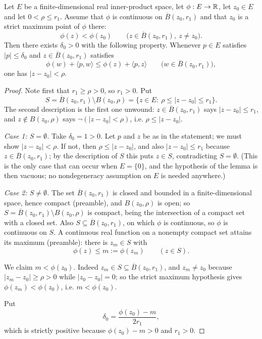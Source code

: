 \begin{lemma}
Let $E$ be a finite-dimensional real inner-product space, let $\phi:E\to\mathbb{R}$, let
$z_0\in E$ and let $0<\rho\le r_1$. Assume that $\phi$ is continuous on
$\overline B(z_0,r_1)$ and that $z_0$ is a strict maximum point of $\phi$ there:
\[
  \phi(z)<\phi(z_0)\qquad\bigl(z\in\overline B(z_0,r_1),\ z\ne z_0\bigr).
\]
Then there exists $\delta_0>0$ with the following property. Whenever $p\in E$
satisfies $|p|\le\delta_0$ and $z\in\overline B(z_0,r_1)$ satisfies
\[
  \phi(w)+\langle p,w\rangle\le\phi(z)+\langle p,z\rangle
  \qquad\bigl(w\in\overline B(z_0,r_1)\bigr),
\]
one has $|z-z_0|<\rho$.
\end{lemma}
\begin{proof}
Note first that $r_1\ge\rho>0$, so $r_1>0$. Put
\[
  S=\overline B(z_0,r_1)\setminus B(z_0,\rho)
   =\bigl\{z\in E:\ \rho\le|z-z_0|\le r_1\bigr\}.
\]
The second description is the first one unwound: $z\in\overline B(z_0,r_1)$ says
$|z-z_0|\le r_1$, and $z\notin B(z_0,\rho)$ says $\neg(|z-z_0|<\rho)$, i.e.
$\rho\le|z-z_0|$.

\emph{Case 1: $S=\emptyset$.}
Take $\delta_0=1>0$. Let $p$ and $z$ be as in the statement; we must show
$|z-z_0|<\rho$. If not, then $\rho\le|z-z_0|$, and also $|z-z_0|\le r_1$
because $z\in\overline B(z_0,r_1)$; by the description of $S$ this puts $z\in
S$, contradicting $S=\emptyset$. (This is the only case that can occur when
$E=\{0\}$, and the hypothesis of the lemma is then vacuous; no nondegeneracy
assumption on $E$ is needed anywhere.)

\emph{Case 2: $S\ne\emptyset$.}
The set $\overline B(z_0,r_1)$ is closed and bounded in a finite-dimensional
space, hence compact (preamble), and $B(z_0,\rho)$ is open; so
$S=\overline B(z_0,r_1)\setminus B(z_0,\rho)$ is compact, being the
intersection of a compact set with a closed set. Also $S\subseteq\overline
B(z_0,r_1)$, on which $\phi$ is continuous, so $\phi$ is continuous on $S$.
A continuous real function on a nonempty compact set attains its maximum
(preamble): there is $z_m\in S$ with
\[
  \phi(z)\le m:=\phi(z_m)\qquad(z\in S).
\]

We claim $m<\phi(z_0)$. Indeed $z_m\in S\subseteq\overline B(z_0,r_1)$, and
$z_m\ne z_0$ because $|z_m-z_0|\ge\rho>0$ while $|z_0-z_0|=0$; so the strict
maximum hypothesis gives $\phi(z_m)<\phi(z_0)$, i.e. $m<\phi(z_0)$.

Put
\[
  \delta_0=\frac{\phi(z_0)-m}{2r_1},
\]
which is strictly positive because $\phi(z_0)-m>0$ and $r_1>0$.


\end{proof}
